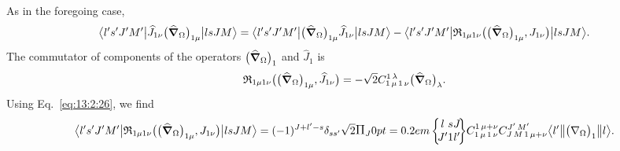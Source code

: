 As in the foregoing case,
\begin{equation}
\bigl\langle  l^{\prime} s^{\prime} J^{\prime} M^{\prime} \big|  \widehat{J}_{1 \nu}\bigl(\widehat{\boldsymbol{\nabla}}_{\Omega}\bigr)_{1 \mu} \big| l s J M \bigr\rangle=
\bigl\langle  l^{\prime} s^{\prime} J^{\prime} M^{\prime} \big| \bigl(\widehat{\boldsymbol{\nabla}}_{\Omega}\bigr)_{1 \mu} \widehat{J}_{1 \nu} \big| l s J M \bigr\rangle-
\bigl\langle  l^{\prime} s^{\prime} J^{\prime} M^{\prime} \big|  \mathfrak{R}_{1 \mu 1 \nu}\bigl(\bigl(\widehat{\boldsymbol{\nabla}}_{\Omega}\bigr)_{1 \mu}, J_{1 \nu}\bigr) \big| l s J M \bigr\rangle. \label{eq:13:2:58}
\end{equation}
The commutator of components of the operators \(\bigl(\widehat{\boldsymbol{\nabla}}_{\Omega}\bigr)_{1}\) and \(\widehat{J}_{1}\) is
\begin{equation}
\mathfrak{R}_{1 \mu 1 \nu}\bigl(\bigl(\widehat{\boldsymbol{\nabla}}_{\Omega}\bigr)_{1 \mu}, \widehat{J}_{1 \nu}\bigr)=-\sqrt{2} 
C_{1\,\mu\,1\,\nu}^{1\,\lambda}\bigl(\widehat{\boldsymbol{\nabla}}_{\Omega}\bigr)_{\lambda}. \label{eq:13:2:59}
\end{equation}
Using Eq.~\eqref{eq:13:2:26}, we find
\begin{equation}
\braOket{ l^{\prime} s^{\prime} J^{\prime} M^{\prime}}{ \mathfrak{R}_{1 \mu 1 \nu}\bigl(\bigl(\delop_{\Omega}\bigr)_{1 \mu}, J_{1 \nu}\bigr)}{l s J M}=(-1)^{J+l^{\prime}-s} \delta_{s s^{\prime}} \sqrt{2}\Fact{J}
\sixj{l}{s}{J}{J^{\prime}}{1}{l^{\prime}} 
\clebsch{1}{\mu}{1}{\nu}{1}{\mu+\nu} 
\clebsch{J}{M}{1}{\mu+\nu}{J^{\prime}}{M^{\prime}}
\braOketred{ l^{\prime}}{\bigl(\nabla_{\Omega}\bigr)_{1}}{ l}. \label{eq:13:2:60}
\end{equation}

